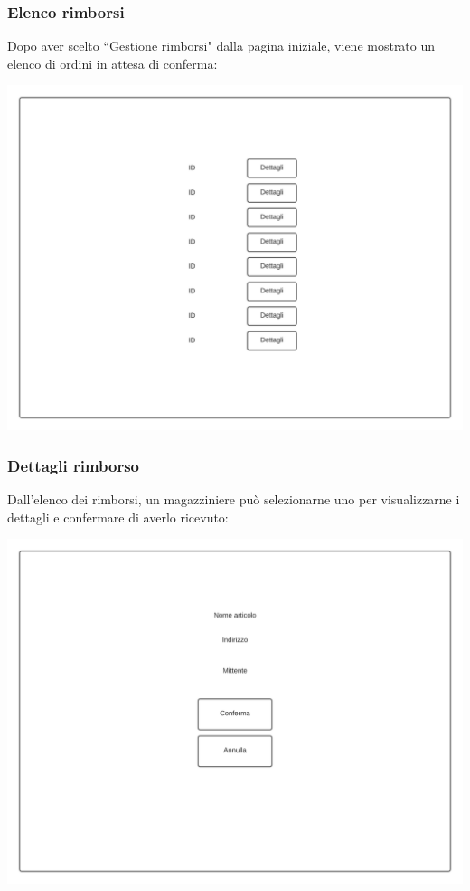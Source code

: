 \documentclass[12pt]{article}
\begin{document}
\subsubsection{Elenco rimborsi}
Dopo aver scelto ``Gestione rimborsi" dalla pagina iniziale, viene mostrato un elenco di ordini in attesa di conferma:

\begin{center}
\includegraphics[height=0.3\textheight]{Mockup/Magazziniere/Elenco}
\end{center}

\newpage

\subsubsection{Dettagli rimborso}
Dall'elenco dei rimborsi, un magazziniere può selezionarne uno per visualizzarne i dettagli e confermare di averlo ricevuto:

\begin{center}
\includegraphics[height=0.3\textheight]{Mockup/Magazziniere/DettagliRimborso}
\end{center}
\end{document}
